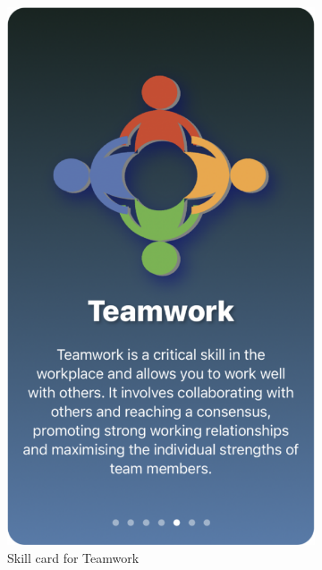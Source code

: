 \documentclass{l4proj}
\begin{document}
\begin{appendices}
\begin{figure}[H]
\begin{subfigure}[b]{0.3\textwidth}
        \includegraphics[scale=0.25]{images/TeamworkCard.pdf}
        \caption{Skill card for Teamwork}
        \label{fig:TeamworkCard}
    \end{subfigure}
    \begin{subfigure}[b]{0.3\textwidth}

\end{subfigure}
\end{figure}
\end{appendices}
\end{document}
